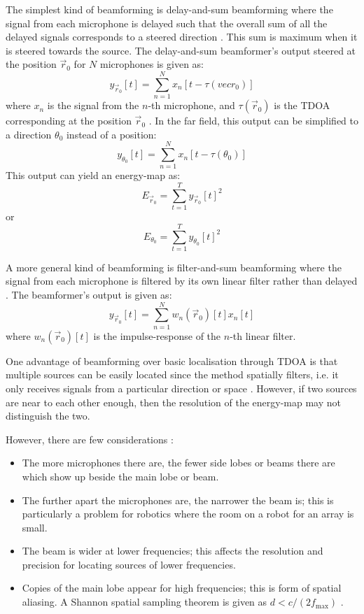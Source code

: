 \documentclass{report}
\begin{document}
The simplest kind of beamforming is delay-and-sum beamforming where the signal from each microphone is delayed such that the overall sum of all the delayed signals corresponds to a steered direction \cite{rascon_localization_2017}. This sum is maximum when it is steered towards the source. The delay-and-sum beamformer's output steered at the position $\vec{r}_0$ for $N$ microphones is given as:
\begin{equation}
y_{\vec{r}_0}[t] = \sum_{n=1}^N x_n[t-\tau(vec{r}_0)] 
\end{equation}
where $x_n$ is the signal from the $n$-th microphone, and $\tau(\vec{r}_0)$ is the TDOA corresponding at the position $\vec{r}_0$ \cite{argentieri_survey_2015}. In the far field, this output can be simplified to a direction $\theta_0$ instead of a position:
\begin{equation}
y_{\theta_0}[t] = \sum_{n=1}^N x_n[t-\tau(\theta_0)] 
\end{equation}
This output can yield an energy-map as:
\begin{equation}
E_{\vec{r}_0} = \sum_{t=1}^T y_{\vec{r}_0}[t]^2
\end{equation}
or
\begin{equation}
E_{\theta_0} = \sum_{t=1}^T y_{\theta_0}[t]^2
\end{equation}

A more general kind of beamforming is filter-and-sum beamforming where the signal from each microphone is filtered by its own linear filter rather than delayed \cite{argentieri_survey_2015}. The beamformer's output is given as:
\begin{equation}
y_{\vec{r}_0}[t] = \sum_{n=1}^N w_n(\vec{r}_0)[t]x_n[t]
\end{equation} 
where $w_n(\vec{r}_0)[t]$ is the impulse-response of the $n$-th linear filter.

One advantage of beamforming over basic localisation through TDOA is that multiple sources can be easily located since the method spatially filters, i.e. it only receives signals from a particular direction or space \cite{rascon_localization_2017}. However, if two sources are near to each other enough, then the resolution of the energy-map may not distinguish the two.

However, there are few considerations \cite{argentieri_survey_2015}:
\begin{itemize}
	\item The more microphones there are, the fewer side lobes or beams there are which show up beside the main lobe or beam.
	\item The further apart the microphones are, the narrower the beam is; this is particularly a problem for robotics where the room on a robot for an array is small.
	\item The beam is wider at lower frequencies; this affects the resolution and precision for locating sources of lower frequencies.
	\item Copies of the main lobe appear for high frequencies; this is form of spatial aliasing. A Shannon spatial sampling theorem is given as $d<c/(2f_{\text{max}})$ \cite{argentieri_survey_2015}.
\end{itemize}
\end{document}
